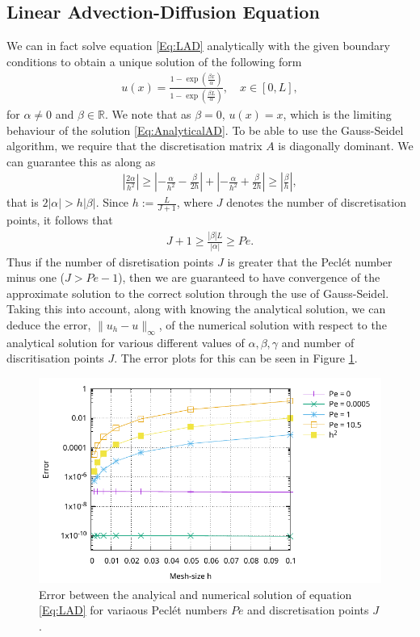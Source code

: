 \documentclass[a4paper,11pt]{article}
\theoremstyle{break}
\theoremstyle{break2}
\theoremstyle{break}
\theoremstyle{break2}
\newcommand{\R}{\mathbb{R}}
\begin{document}
\subsection{Linear Advection-Diffusion Equation}
We can in fact solve equation \eqref{Eq:LAD} analytically with the given boundary conditions to obtain a unique solution of the following form
\begin{align}\label{Eq:AnalyticalAD}
u(x) = \frac{1 - \exp\left(\frac{\beta x}{\alpha}\right)}{1 - \exp\left(\frac{\beta L}{\alpha}\right)}, \quad x \in [0,L],
\end{align}
for $ \alpha \neq 0 $ and $ \beta \in \R $. We note that as $ \beta = 0 $, $ u(x) = x $, which is the limiting behaviour of the solution \eqref{Eq:AnalyticalAD}.
To be able to use the Gauss-Seidel algorithm, we require that the discretisation matrix $ A $ is diagonally dominant. We can guarantee this as along as
\begin{align*}
\left|\frac{2\alpha}{h^2}\right| \geq \left|-\frac{\alpha}{h^2} - \frac{\beta}{2h}\right| + \left|-\frac{\alpha}{h^2} + \frac{\beta}{2h}\right| \geq \left|\frac{\beta}{h}\right|,
\end{align*}
that is $ 2|\alpha| > h|\beta| $. Since $ h := \frac{L}{J+1} $, where $ J $ denotes the number of discretisation points, it follows that
\begin{align*}
J+1 \geq \frac{|\beta|L}{|\alpha|} \geq Pe. 
\end{align*}
Thus if the number of disretisation points $ J $ is greater that the Pecl\'{e}t number minus one ($ J > Pe - 1 $), then we are guaranteed to have convergence of the approximate solution to the correct solution through the use of Gauss-Seidel. Taking this into account, along with knowing the analytical solution, we can deduce the error, $ \|u_h - u\|_{\infty} $, of the numerical solution with respect to the analytical solution for various different values of $ \alpha, \beta, \gamma $ and number of discritisation points $ J $. The error plots for this can be seen in Figure \ref{Fig:ErrorLAD}.
\begin{figure}[h!]
	\centering
	\includegraphics{Error_plots.pdf}
	\caption{Error between the analyical and numerical solution of equation \eqref{Eq:LAD} for variaous Pecl\'{e}t numbers $ Pe $ and discretisation points $ J $. \label{Fig:ErrorLAD}}
\end{figure}
\end{document}
